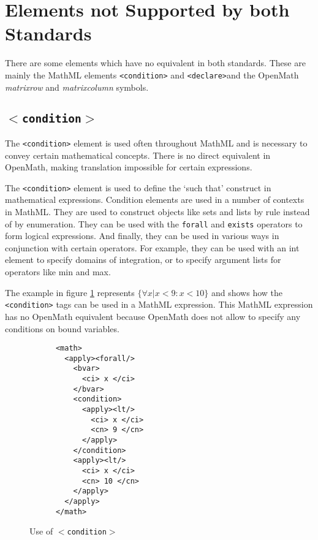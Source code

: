 \section{Elements not Supported by both Standards}

There are some elements which have no equivalent in both standards.
These are mainly the MathML elements \verb|<condition>| and
\verb|<declare>|and the OpenMath {\it matrixrow} and {\it matrixcolumn}
symbols.


\subsection{{\tt $<$condition$>$}}

The \verb|<condition>| element is used often throughout MathML and is
necessary to convey certain mathematical concepts. There is no direct
equivalent in OpenMath, making translation impossible for certain
expressions.

The \verb|<condition>| element is used to define the `such that'
construct in mathematical expressions.  Condition elements are used in
a number of contexts in MathML. They are used to construct objects like
sets and lists by rule instead of by enumeration. They can be used with
the {\tt forall} and {\tt exists} operators to form logical
expressions. And finally, they can be used in various ways in
conjunction with certain operators. For example, they can be used with
an int element to specify domains of integration, or to specify
argument lists for operators like min and max.

The example in figure \ref{forall} represents $\{\forall x | x<9:
x<10\}$ and shows how the \verb|<condition>| tags can be used in a
MathML expression. This MathML expression has no OpenMath equivalent
because OpenMath does not allow to specify any conditions on bound
variables.


\begin{figure}[h]

\begin{verbatim}
      <math>   
        <apply><forall/>
          <bvar>
            <ci> x </ci>
          </bvar>
          <condition>
            <apply><lt/>
              <ci> x </ci>
              <cn> 9 </cn>      
            </apply>
          </condition>
          <apply><lt/>
            <ci> x </ci>
            <cn> 10 </cn>      
          </apply>
        </apply>
      </math>   
\end{verbatim}

\caption{Use of {\tt $<$condition$>$}}
\label{forall}

\end{figure}


